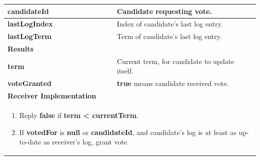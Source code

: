 {\begin{tabular}{|l|p{9cm}|}
        \textbf{candidateId} & Candidate requesting vote. \\
        \hline
        \textbf{lastLogIndex} & Index of candidate's last log entry. \\
        \hline
        \textbf{lastLogTerm} & Term of candidate's last log entry. \\
        \hline
        \rowcolor{OliveGreen!10} \textbf{Results} &  \\
        \hline
        \textbf{term} & Current term, for candidate to update itself. \\
        \hline
        \textbf{voteGranted} & \textbf{true} means candidate received vote. \\
        \hline
        \rowcolor{OliveGreen!10} \textbf{Receiver Implementation} & \\
        \hline
        \multicolumn{2}{|p{9cm}|}{%
            \parbox{11cm}{%
                \begin{enumerate}
                    \item Reply \textbf{false} if \textbf{term < currentTerm}.
                    \item If \textbf{votedFor} is \textbf{null} or \textbf{candidateId}, and candidate's log is at least as up-to-date as receiver's log, grant vote.
                \end{enumerate}
            }
        } \\
        \hline
    
    \end{tabular}
}

\newpage
\clearpage

